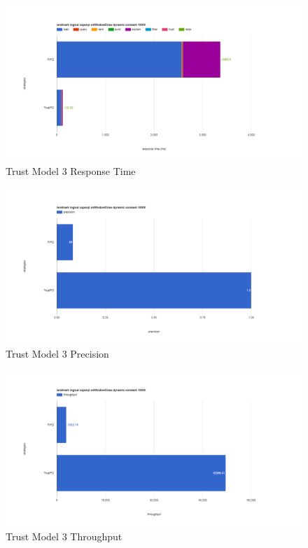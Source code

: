 \begin{figure}[!htbp]
	\centering
    \includegraphics[width=\textwidth]{img/app3-trust-3-r.png}
    \caption{Trust Model 3 Response Time}
\end{figure}
\begin{figure}[!htbp]
	\centering
    \includegraphics[width=\textwidth]{img/app3-trust-3-p.png}
    \caption{Trust Model 3 Precision}
\end{figure}
\begin{figure}[!htbp]
	\centering
    \includegraphics[width=\textwidth]{img/app3-trust-3-t.png}
    \caption{Trust Model 3 Throughput}
\end{figure}
